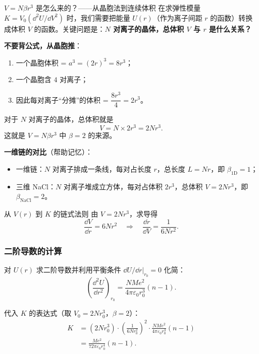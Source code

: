 \begin{insightbox}{$V = N\beta r^3$ 是怎么来的？——从晶胞法到连续体积}
在求弹性模量 $K = V_0 (\dd^2 U/\dd V^2)$ 时，我们需要把能量 $U(r)$（作为离子间距 $r$ 的函数）转换成体积 $V$ 的函数。关键问题是：\textbf{$N$ 对离子的晶体，总体积 $V$ 与 $r$ 是什么关系？}

\textbf{不要背公式，从晶胞推}：
\begin{enumerate}[nosep]
  \item 一个晶胞体积 = $a^3 = (2r)^3 = 8r^3$；
  \item 一个晶胞含 $4$ 对离子；
  \item 因此每对离子``分摊''的体积 = $\dfrac{8r^3}{4} = 2r^3$。
\end{enumerate}

对于 $N$ 对离子的晶体，总体积就是
\[
  \boxed{ V = N\times 2r^3 = 2Nr^3 }.
\]
这就是 $V = N\beta r^3$ 中 $\beta = 2$ 的来源。

\textbf{一维链的对比}（帮助记忆）：
\begin{itemize}[nosep]
  \item 一维链：$N$ 对离子排成一条线，每对占长度 $r$，总长度 $L = Nr$，即 $\beta_{\text{1D}} = 1$；
  \item 三维 NaCl：$N$ 对离子堆成立方体，每对占体积 $2r^3$，总体积 $V = 2Nr^3$，即 $\beta_{\text{NaCl}} = 2$。
\end{itemize}
\end{insightbox}

\begin{modelbox}{从 $V(r)$ 到 $K$ 的链式法则}
由 $V = 2Nr^3$，求导得
\[
  \frac{\dd V}{\dd r} = 6Nr^2
  \quad\Longrightarrow\quad
  \frac{\dd r}{\dd V} = \frac{1}{6Nr^2}.
\]
\end{modelbox}

\subsubsection{二阶导数的计算}

对 $U(r)$ 求二阶导数并利用平衡条件 $\dd U/\dd r|_{r_0}=0$ 化简：
\[
  \left(\frac{\dd^2 U}{\dd r^2}\right)_{r_0}
  = \frac{NMe^2}{4\pi\varepsilon_0 r_0^3}(n-1).
\]

代入 $K$ 的表达式（取 $V_0 = 2Nr_0^3$，$\beta=2$）：
\begin{align*}
  K &= (2Nr_0^3)\cdot\left(\frac{1}{6Nr_0^2}\right)^2
      \cdot\frac{NMe^2}{4\pi\varepsilon_0 r_0^3}(n-1) \\
    &= \frac{Me^2}{72\pi\varepsilon_0 r_0^4}(n-1).
\end{align*}

